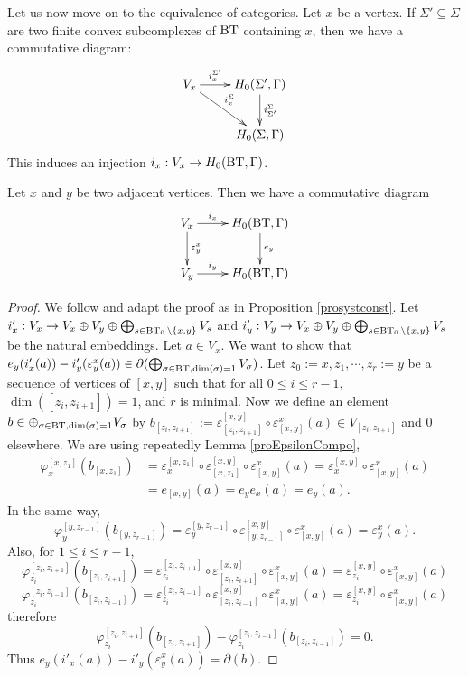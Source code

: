 \documentclass[a4paper,10pt]{amsart}
\begin{document}
Let us now move on to the equivalence of categories. Let $x$ be a vertex. If $\Sigma' \subseteq \Sigma$ are two finite convex subcomplexes of $\bt$ containing $x$, then we have a commutative diagram:
\[
	 \xymatrix{
    V_x \ar[r]^-{i_x^{\Sigma'}} \ar[rd]^-{i_x^{\Sigma}} & H_0(\Sigma',\Gamma) \ar[d]^-{i_{\Sigma'}^{\Sigma}} \\
     & H_0(\Sigma,\Gamma)
  }
\]
This induces an injection $i_x : V_x \to H_0(\bt,\Gamma)$.

\begin{Lem}
	\label{lemDiagCommix}

	Let $x$ and $y$ be two adjacent vertices. Then we have a commutative diagram
	\[
	 \xymatrix{
    V_x \ar[r]^-{i_x} \ar[d]^-{\varepsilon_y^x} & H_0(\bt,\Gamma) \ar[d]^-{e_y} \\
    V_y \ar[r]^-{i_y} & H_0(\bt,\Gamma)
  }
\]
\end{Lem}

\begin{proof}
	We follow {\cite[Lem. 2.4.2]{Wanga}} and adapt the proof as in Proposition \ref{prosystconst}. Let $i_x' : V_x \to V_x \oplus V_y \oplus \bigoplus_{s \in \bts \setminus \{x,y\}} V_s$ and $i_y' : V_y \to V_x \oplus V_y \oplus \bigoplus_{s \in \bts \setminus \{x,y\}} V_s$ be the natural embeddings. Let $a \in V_x$. We want to show that $e_y(i'_x(a))-i'_y(\varepsilon^x_y(a)) \in \partial(\bigoplus_{\sigma \in \bt, \dim(\sigma)=1} V_\sigma)$. Let $z_0:=x,z_1,\cdots,z_r:=y$ be a sequence of vertices of $[x,y]$ such that for all $0 \leq i \leq r-1$, $\dim([z_i,z_{i+1}])=1$, and $r$ is minimal. Now we define an element $b \in \oplus_{\sigma \in \bt, \dim(\sigma)=1}V_\sigma$ by $b_{[z_i,z_{i+1}]}:= \varepsilon^{[x,y]}_{[z_i,z_{i+1}]} \circ \varepsilon^{x}_{[x,y]} (a) \in V_{[z_i,z_{i+1}]}$ and 0 elsewhere. We are using repeatedly Lemma \ref{proEpsilonCompo}, 
	\begin{align*}
		\varphi^{[x,z_1]}_x(b_{[x,z_1]}) &=\varepsilon^{[x,z_1]}_x  \circ  \varepsilon^{[x,y]}_{[x,z_{1}]} \circ \varepsilon^{x}_{[x,y]} (a) = \varepsilon^{[x,y]}_{x} \circ \varepsilon^{x}_{[x,y]} (a) \\
		&= e_{[x,y]}(a)=e_ye_x(a)=e_y(a).
			\end{align*}
	In the same way,
	\[
		\varphi^{[y,z_{r-1}]}_y(b_{[y,z_{r-1}]}) =\varepsilon^{[y,z_{r-1}]}_y  \circ  \varepsilon^{[x,y]}_{[y,z_{r-1}]} \circ \varepsilon^{x}_{[x,y]} (a)   = \varepsilon^{x}_{y} (a).
	\]
	Also, for $1 \leq i \leq r-1$,
	\[
	 	\varphi^{[z_i,z_{i+1}]}_{z_i}(b_{[z_i,z_{i+1}]}) = \varepsilon^{[z_i,z_{i+1}]}_{z_i} \circ \varepsilon^{[x,y]}_{[z_i,z_{i+1}]} \circ \varepsilon^{x}_{[x,y]} (a) = \varepsilon^{[x,y]}_{z_i} \circ \varepsilon^{x}_{[x,y]} (a)
	 \]
	 \[
	 	\varphi^{[z_i,z_{i-1}]}_{z_{i}}(b_{[z_i,z_{i-1}]}) = \varepsilon^{[z_i,z_{i-1}]}_{z_{i}} \circ \varepsilon^{[x,y]}_{[z_i,z_{i-1}]} \circ \varepsilon^{x}_{[x,y]} (a) = \varepsilon^{[x,y]}_{z_{i}} \circ \varepsilon^{x}_{[x,y]} (a)
	 \]
	 therefore 
	 \[
	 	\varphi^{[z_i,z_{i+1}]}_{z_i}(b_{[z_i,z_{i+1}]}) - \varphi^{[z_i,z_{i-1}]}_{z_{i}}(b_{[z_i,z_{i-1}]}) = 0.
	 \]
	 Thus $e_y(i'_x(a))-i'_y(\varepsilon^x_y(a)) = \partial(b).$
\end{proof}
\end{document}
